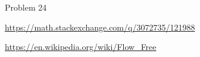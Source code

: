 \documentclass{article}
\begin{document}
\begin{references}
  \item Problem 24
  \item \url{https://math.stackexchange.com/q/3072735/121988}
  \item \url{https://en.wikipedia.org/wiki/Flow_Free}
\end{references}
\end{document}
